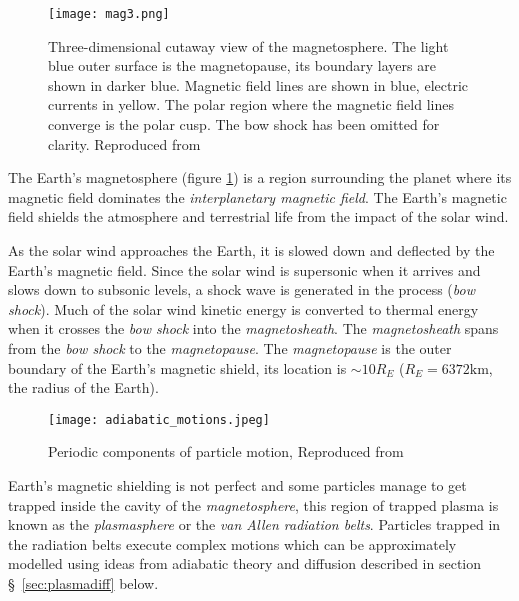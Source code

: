 \begin{figure}
    \noindent\texttt{[image: mag3.png]}
    \caption{{\small Three-dimensional cutaway view of the magnetosphere. The light blue outer surface is the magnetopause, 
    its boundary layers are shown in darker blue. Magnetic field lines are shown in blue, electric currents in yellow. 
    The polar region where the magnetic field lines converge is the polar cusp. The bow shock has been omitted for clarity. 
    Reproduced from \citet{DeKeyser2005}}
    }
    \label{fig:magnetosphere}
\end{figure}

The Earth's magnetosphere (figure \ref{fig:magnetosphere}) is a region surrounding the planet where its magnetic field 
dominates the \emph{interplanetary magnetic field}. The Earth's magnetic field shields the atmosphere and terrestrial life 
from the impact of the solar wind. 

As the solar wind approaches the Earth, it is slowed down and deflected by the Earth's magnetic field. Since the 
solar wind is supersonic when it arrives and slows down to subsonic levels, a shock wave is generated in the 
process (\emph{bow shock}). Much of the solar wind kinetic energy is converted to thermal energy when it crosses 
the \emph{bow shock} into the \emph{magnetosheath}. The \emph{magnetosheath} spans from the \emph{bow shock} to 
the \emph{magnetopause}. The \emph{magnetopause} is the outer boundary of the Earth's magnetic shield, its location 
is $\sim 10R_E$ ($R_E = 6372 \text{km}$, the radius of the Earth). 

\begin{wrapfigure}{r}{0.4\textwidth}
    \centering\texttt{[image: adiabatic\_motions.jpeg]}
    \caption{
        {\small Periodic components of particle motion, Reproduced from \citet{roederer2012dynamics}}}
    \label{fig:particlemotions}
\end{wrapfigure}


Earth's magnetic shielding is not perfect and some particles manage to get trapped inside the cavity of the 
\emph{magnetosphere}, this region of trapped plasma is known as the \emph{plasmasphere} or the \emph{van Allen 
radiation belts}. Particles trapped in the radiation belts execute complex motions which can be approximately 
modelled using ideas from adiabatic theory and diffusion described in section \S~\ref{sec:plasmadiff} below. 

